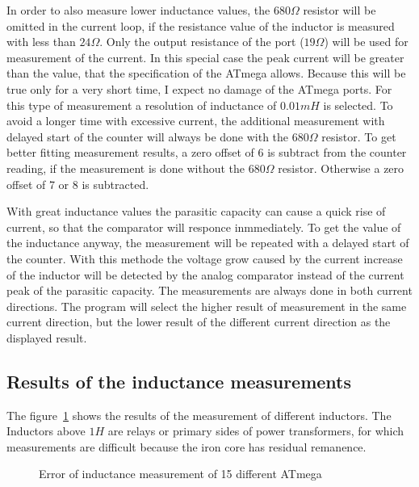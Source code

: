 In order to also measure lower inductance values, the \(680\Omega\) resistor will be omitted in the current loop,
if the resistance value of the inductor is measured with less than \(24\Omega\).
Only the output resistance of the port (\(19\Omega\)) will be used for measurement of the current.
In this special case the peak current will be greater than the value, that the specification of the ATmega allows.
Because this will be true only for a very short time, I expect no damage of the ATmega ports.
For this type of measurement a resolution of inductance of \(0.01mH\) is selected.
To avoid a longer time with excessive current, the additional measurement with delayed start of the counter will always be
done with the \(680\Omega\) resistor.
To get better fitting measurement results, a zero offset of 6 is subtract from the counter reading, 
if the measurement is done without the \(680\Omega\) resistor. Otherwise a zero offset of 7 or 8 is subtracted.


With great inductance values the parasitic capacity can cause a quick rise of current, so that the comparator
will responce inmmediately.
To get the value of the inductance anyway, the measurement will be repeated with a delayed start of the counter.
With this methode the voltage grow caused by the current increase of the inductor will be detected by the
analog comparator instead of the current peak of the parasitic capacity.
The measurements are always done in both current directions.
The program will select the higher result of measurement in the same current direction, but the
lower result of the different current direction as the displayed result.

\subsection{Results of the inductance measurements}
The figure~\ref{fig:Induct328p} shows the results of the measurement of different inductors.
The Inductors above \(1H\) are relays or primary sides of power transformers, for which
measurements are difficult because the iron core has residual remanence.


\begin{figure}[H]
\centering

\caption{Error of inductance measurement of 15 different ATmega}
\label{fig:Induct328p}
\end{figure}

